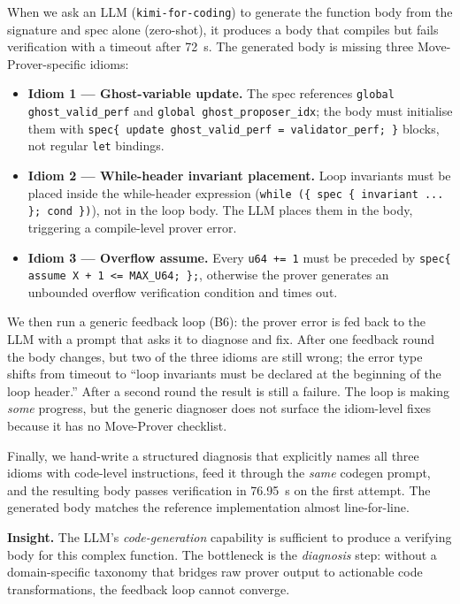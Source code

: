 \documentclass[conference]{IEEEtran}
\begin{document}
When we ask an LLM (\texttt{kimi-for-coding}) to generate the function body from the signature and spec alone (zero-shot), it produces a body that compiles but fails verification with a timeout after 72~s. The generated body is missing three Move-Prover-specific idioms:

\begin{itemize}
\item \textbf{Idiom 1 --- Ghost-variable update.} The spec references \texttt{global ghost\_valid\_perf} and \texttt{global ghost\_proposer\_idx}; the body must initialise them with \texttt{spec\{ update ghost\_valid\_perf = validator\_perf; \}} blocks, not regular \texttt{let} bindings.
\item \textbf{Idiom 2 --- While-header invariant placement.} Loop invariants must be placed inside the while-header expression (\texttt{while (\{ spec \{ invariant ... \}; cond \})}), not in the loop body. The LLM places them in the body, triggering a compile-level prover error.
\item \textbf{Idiom 3 --- Overflow assume.} Every \texttt{u64 += 1} must be preceded by \texttt{spec\{ assume X + 1 <= MAX\_U64; \};}, otherwise the prover generates an unbounded overflow verification condition and times out.
\end{itemize}

We then run a generic feedback loop (B6): the prover error is fed back to the LLM with a prompt that asks it to diagnose and fix. After one feedback round the body changes, but two of the three idioms are still wrong; the error type shifts from timeout to ``loop invariants must be declared at the beginning of the loop header.'' After a second round the result is still a failure. The loop is making \textit{some} progress, but the generic diagnoser does not surface the idiom-level fixes because it has no Move-Prover checklist.

Finally, we hand-write a structured diagnosis that explicitly names all three idioms with code-level instructions, feed it through the \textit{same} codegen prompt, and the resulting body passes verification in 76.95~s on the first attempt. The generated body matches the reference implementation almost line-for-line.

\textbf{Insight.} The LLM's \textit{code-generation} capability is sufficient to produce a verifying body for this complex function. The bottleneck is the \textit{diagnosis} step: without a domain-specific taxonomy that bridges raw prover output to actionable code transformations, the feedback loop cannot converge.
\end{document}
